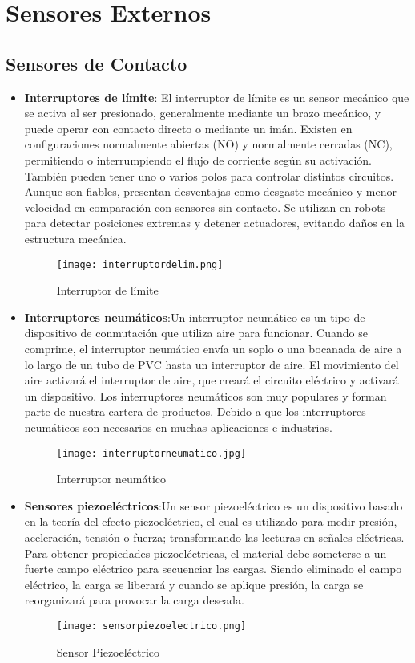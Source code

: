 	\newpage
	\section{Sensores Externos}
	\subsection{Sensores de Contacto}

\begin{itemize}
	\item \textbf{Interruptores de límite}: El interruptor de límite es un sensor mecánico que se activa al ser presionado, generalmente mediante un brazo mecánico, y puede operar con contacto directo o mediante un imán. Existen en configuraciones normalmente abiertas (NO) y normalmente cerradas (NC), permitiendo o interrumpiendo el flujo de corriente según su activación. También pueden tener uno o varios polos para controlar distintos circuitos. Aunque son fiables, presentan desventajas como desgaste mecánico y menor velocidad en comparación con sensores sin contacto. Se utilizan en robots para detectar posiciones extremas y detener actuadores, evitando daños en la estructura mecánica.
	\begin{figure}[H]
		\centering
		\texttt{[image: interruptordelim.png]}
		\caption{Interruptor de límite}
	\end{figure}
	
	\item \textbf{Interruptores neumáticos}:Un interruptor neumático es un tipo de dispositivo de conmutación que utiliza aire para funcionar. Cuando se comprime, el interruptor neumático envía un soplo o una bocanada de aire a lo largo de un tubo de PVC hasta un interruptor de aire. El movimiento del aire activará el interruptor de aire, que creará el circuito eléctrico y activará un dispositivo. Los interruptores neumáticos son muy populares y forman parte de nuestra cartera de productos. Debido a que los interruptores neumáticos son necesarios en muchas aplicaciones e industrias.
	\begin{figure}[H]
		\centering
		\texttt{[image: interruptorneumatico.jpg]}
		\caption{Interruptor neumático}
	\end{figure}
	
	
	\item \textbf{Sensores piezoeléctricos}:Un sensor piezoeléctrico es un dispositivo basado en la teoría del efecto piezoeléctrico, el cual es utilizado para medir presión, aceleración, tensión o fuerza; transformando las lecturas en señales eléctricas. Para obtener propiedades piezoeléctricas, el material debe someterse a un fuerte campo eléctrico para secuenciar las cargas. Siendo eliminado el campo eléctrico, la carga se liberará y cuando se aplique presión, la carga se reorganizará para provocar la carga deseada. 
	\begin{figure}[H]
		\centering
		\texttt{[image: sensorpiezoelectrico.png]}
		\caption{Sensor Piezoeléctrico}
	\end{figure}
	

\end{itemize}
